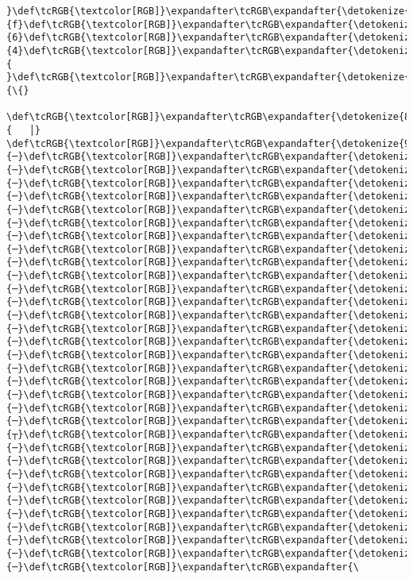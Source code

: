 \documentclass[11pt]{article}
\begin{document}
\begin{Verbatim}[commandchars=\\\{\}, frame=single, framerule=2mm, rulecolor=\color{outerrorbackground}]
}\def\tcRGB{\textcolor[RGB]}\expandafter\tcRGB\expandafter{\detokenize{95,0,135}}{f}\def\tcRGB{\textcolor[RGB]}\expandafter\tcRGB\expandafter{\detokenize{95,0,135}}{6}\def\tcRGB{\textcolor[RGB]}\expandafter\tcRGB\expandafter{\detokenize{95,0,135}}{4}\def\tcRGB{\textcolor[RGB]}\expandafter\tcRGB\expandafter{\detokenize{178,178,178}}{ }\def\tcRGB{\textcolor[RGB]}\expandafter\tcRGB\expandafter{\detokenize{178,178,178}}{\{}
 \def\tcRGB{\textcolor[RGB]}\expandafter\tcRGB\expandafter{\detokenize{88,88,88}}{   │}     \def\tcRGB{\textcolor[RGB]}\expandafter\tcRGB\expandafter{\detokenize{95,0,135}}{─}\def\tcRGB{\textcolor[RGB]}\expandafter\tcRGB\expandafter{\detokenize{95,0,135}}{─}\def\tcRGB{\textcolor[RGB]}\expandafter\tcRGB\expandafter{\detokenize{95,0,135}}{─}\def\tcRGB{\textcolor[RGB]}\expandafter\tcRGB\expandafter{\detokenize{95,0,135}}{─}\def\tcRGB{\textcolor[RGB]}\expandafter\tcRGB\expandafter{\detokenize{95,0,135}}{─}\def\tcRGB{\textcolor[RGB]}\expandafter\tcRGB\expandafter{\detokenize{95,0,135}}{─}\def\tcRGB{\textcolor[RGB]}\expandafter\tcRGB\expandafter{\detokenize{95,0,135}}{─}\def\tcRGB{\textcolor[RGB]}\expandafter\tcRGB\expandafter{\detokenize{95,0,135}}{─}\def\tcRGB{\textcolor[RGB]}\expandafter\tcRGB\expandafter{\detokenize{95,0,135}}{─}\def\tcRGB{\textcolor[RGB]}\expandafter\tcRGB\expandafter{\detokenize{95,0,135}}{─}\def\tcRGB{\textcolor[RGB]}\expandafter\tcRGB\expandafter{\detokenize{95,0,135}}{─}\def\tcRGB{\textcolor[RGB]}\expandafter\tcRGB\expandafter{\detokenize{95,0,135}}{─}\def\tcRGB{\textcolor[RGB]}\expandafter\tcRGB\expandafter{\detokenize{95,0,135}}{─}\def\tcRGB{\textcolor[RGB]}\expandafter\tcRGB\expandafter{\detokenize{95,0,135}}{─}\def\tcRGB{\textcolor[RGB]}\expandafter\tcRGB\expandafter{\detokenize{95,0,135}}{─}\def\tcRGB{\textcolor[RGB]}\expandafter\tcRGB\expandafter{\detokenize{95,0,135}}{─}\def\tcRGB{\textcolor[RGB]}\expandafter\tcRGB\expandafter{\detokenize{95,0,135}}{─}\def\tcRGB{\textcolor[RGB]}\expandafter\tcRGB\expandafter{\detokenize{95,0,135}}{─}\def\tcRGB{\textcolor[RGB]}\expandafter\tcRGB\expandafter{\detokenize{95,0,135}}{─}\def\tcRGB{\textcolor[RGB]}\expandafter\tcRGB\expandafter{\detokenize{95,0,135}}{─}\def\tcRGB{\textcolor[RGB]}\expandafter\tcRGB\expandafter{\detokenize{95,0,135}}{─}\def\tcRGB{\textcolor[RGB]}\expandafter\tcRGB\expandafter{\detokenize{95,0,135}}{┬}\def\tcRGB{\textcolor[RGB]}\expandafter\tcRGB\expandafter{\detokenize{95,0,135}}{─}\def\tcRGB{\textcolor[RGB]}\expandafter\tcRGB\expandafter{\detokenize{95,0,135}}{─}\def\tcRGB{\textcolor[RGB]}\expandafter\tcRGB\expandafter{\detokenize{95,0,135}}{─}\def\tcRGB{\textcolor[RGB]}\expandafter\tcRGB\expandafter{\detokenize{95,0,135}}{─}\def\tcRGB{\textcolor[RGB]}\expandafter\tcRGB\expandafter{\detokenize{95,0,135}}{─}\def\tcRGB{\textcolor[RGB]}\expandafter\tcRGB\expandafter{\detokenize{95,0,135}}{─}\def\tcRGB{\textcolor[RGB]}\expandafter\tcRGB\expandafter{\detokenize{95,0,135}}{─}\def\tcRGB{\textcolor[RGB]}\expandafter\tcRGB\expandafter{\detokenize{95,0,135}}{─}\def\tcRGB{\textcolor[RGB]}\expandafter\tcRGB\expandafter{\detokenize{95,0,135}}{─}\def\tcRGB{\textcolor[RGB]}\expandafter\tcRGB\expandafter{\detokenize{95,0,135}}{─}\def\tcRGB{\textcolor[RGB]}\expandafter\tcRGB\expandafter{\
\end{Verbatim}
\end{document}

